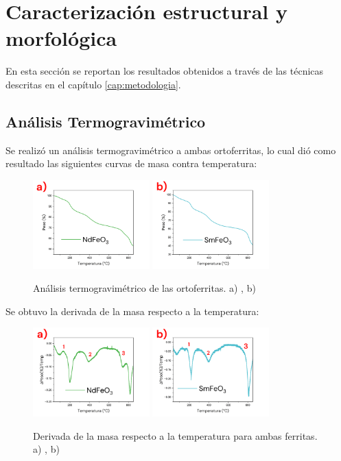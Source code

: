 \documentclass[../main.tex]{subfiles}
\begin{document}
\section{Caracterización estructural y morfológica}
En esta sección se reportan los resultados obtenidos a través de las técnicas descritas en el capítulo \ref{cap:metodologia}.
\subsection{Análisis Termogravimétrico} \label{sec:TGA}
Se realizó un análisis termogravimétrico a ambas ortoferritas, lo cual dió como resultado las siguientes curvas de masa contra temperatura:
\begin{figure}[H]
    \centering
    \includegraphics[width=0.4\textwidth]{fig/TGA-NdFeO3.png}
    \quad
    \includegraphics[width=0.4\textwidth]{fig/TGA-SmFeO3.png}
    \caption{Análisis termogravimétrico de las ortoferritas. a) \neod{}, b) \sama{}}
    \label{fig:TGAres}
\end{figure}
Se obtuvo la derivada de la masa respecto a la temperatura:
\begin{figure}[H]
    \centering
    \includegraphics[width=0.4\textwidth]{fig/TGA-derNdFeO3.png}
    \quad
    \includegraphics[width=0.4\textwidth]{fig/TGA-derSmFeO3.png}
    \caption{Derivada de la masa respecto a la temperatura para ambas ferritas. a) \neod{}, b) \sama{}}
    \label{fig:derTGAres}
\end{figure}
\end{document}
